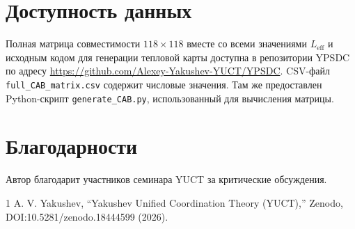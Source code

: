 \documentclass[11pt,a4paper]{article}
\begin{document}
	\section*{Доступность данных}
	Полная матрица совместимости \(118\times118\) вместе со всеми значениями \(L_{\mathrm{eff}}\) и исходным кодом для генерации тепловой карты доступна в репозитории YPSDC по адресу \url{https://github.com/Alexey-Yakushev-YUCT/YPSDC}. CSV-файл \texttt{full\_CAB\_matrix.csv} содержит числовые значения. Там же предоставлен Python-скрипт \texttt{generate\_CAB.py}, использованный для вычисления матрицы.
	
	\section*{Благодарности}
	Автор благодарит участников семинара YUCT за критические обсуждения.
	
	
	\begin{thebibliography}{1}
		 A. V. Yakushev, ``Yakushev Unified Coordination Theory (YUCT),'' Zenodo, DOI:10.5281/zenodo.18444599 (2026).
	\end{thebibliography}
	
\end{document}
